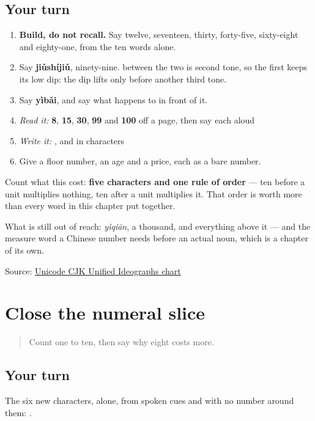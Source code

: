 \subsection*{Your turn}
\begin{enumerate}
\raggedright
  \item \textbf{Build, do not recall.} Say twelve, seventeen, thirty, forty-five, sixty-eight and eighty-one, from the ten words alone.
  \item Say \textbf{jiǔshíjiǔ}, ninety-nine.  between the two  is second tone, so the first  keeps its low dip: the dip lifts only before another third tone.
  \item Say \textbf{yìbǎi}, and say what happens to  in front of it.
  \item \emph{Read it:} \textbf{8}, \textbf{15}, \textbf{30}, \textbf{99} and \textbf{100} off a page, then say each aloud
  \item \emph{Write it:} \textbf{}, \textbf{} and \textbf{} in characters
  \item Give a floor number, an age and a price, each as a bare number.
\end{enumerate}

Count what this cost: \textbf{five characters and one rule of order} — ten before a unit multiplies nothing, ten after a unit multiplies it. That order is worth more than every word in this chapter put together.

What is still out of reach: \emph{yìqiān}, a thousand, and everything above it — and the measure word a Chinese number needs before an actual noun, which is a chapter of its own.

\begin{tcolorbox}[breakable,colback=teal!4,colframe=teal!35!black,title={Before you move on}]
Source: \href{https://www.unicode.org/charts/PDF/U4E00.pdf}{Unicode CJK Unified Ideographs chart}
\end{tcolorbox}
\section[Practice]{Close the numeral slice}

\label{lesson:ZH-R21-close}



\begin{quote}
Count one to ten, then say why eight costs more.
\end{quote}

\subsection*{Your turn}
The six new characters, alone, from spoken cues and with no number around them: \textbf{     }.

